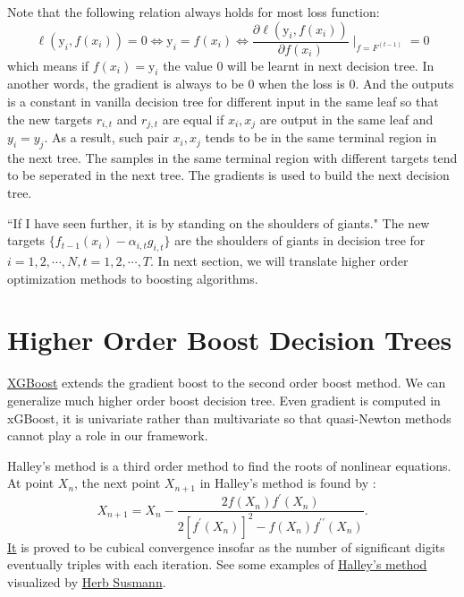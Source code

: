 \documentclass[UTF8]{article}
\begin{document}
Note that the following relation always holds for most loss function:
$$\ell(\mathrm{y}_i, f(x_i))=0\iff \mathrm{y}_i = f(x_i)\iff \frac{\partial \ell(\mathrm{y}_i, f(x_i))}{\partial f(x_i)}\mid_{f=F^{(t-1)}}=0$$
which means if $f(x_i)=\mathrm{y}_i$ the value $0$ will be learnt in next decision tree.
In another words, the gradient is always to be $0$  when the loss is $0$.
And the outputs is a constant in vanilla decision tree for different input in the same leaf
so that the new targets $r_{i,t}$ and $r_{j, t}$ are equal if $x_i, x_j$ are output in the same leaf and $y_i=y_j$.
As a result, such pair $x_i, x_j$ tends to be in the same terminal region in the next tree.
The samples in the same terminal region with different targets tend to be seperated in the next tree.
The gradients is used to build the next decision tree.

``If I have seen further, it is by standing on the shoulders of giants."
The new targets $\{f_{t-1}(x_i)-\alpha_{i,t}g_{i,t}\}$ are the shoulders of giants in decision tree for $i=1,2,\cdots, N, t=1,2,\cdots, T$.
In next section, we will translate higher order optimization methods to boosting algorithms.

\section{Higher Order Boost Decision Trees}

\href{https://arxiv.org/abs/1603.02754}{XGBoost} extends the gradient boost to the second order boost method.
We can generalize much higher order boost decision tree.
Even gradient is computed in xGBoost, it is univariate rather than multivariate so that quasi-Newton methods cannot play a role in our framework. 

Halley's method is a third order method to find the roots of nonlinear equations.
At point $X_n$, the next point $X_{n+1}$ in Halley's method is found by :
\begin{equation}
X_{n+1}=X_n-\frac{2f(X_n)f^{\prime}(X_n)}{2[f^{\prime}(X_n)]^2 - f(X_n)f^{\prime\prime}(X_n)}.\label{Halley's Method}
\end{equation}
\href{https://ms.yccd.edu/Data/Sites/1/userfiles/facstaff/jthoo/cvandpubs/papers/halley.pdf}{It} is proved to be cubical convergence insofar as the number of significant digits eventually triples with each iteration.
See some examples of \href{https://observablehq.com/@herbps10/halleys-method}{Halley's method} visualized by \href{https://observablehq.com/@herbps10}{Herb Susmann}.
\end{document}
